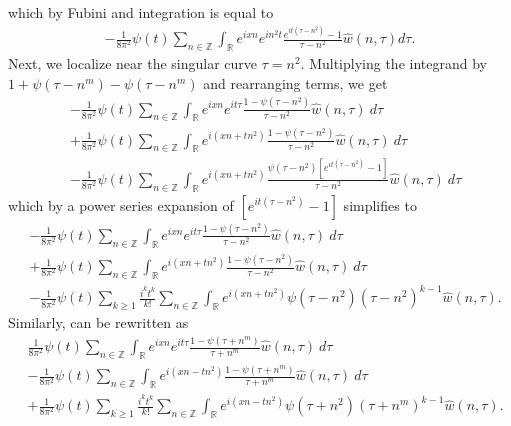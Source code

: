 \documentclass[12pt,reqno]{amsart}
\numberwithin{equation}{section}  %
\renewcommand{\cref}{\Cref}
\newcommand{\rr}{\mathbb{R}}
\newcommand{\zz}{\mathbb{Z}}
\newcommand{\wh}{\widehat}
\begin{document}
%
%
which by Fubini and integration is equal to
%
%
\begin{equation*}
\begin{split}
  -\frac{1}{8 \pi^{2}}  \psi(t) \sum_{n \in \zz} \int_{\rr} e^{ixn}
  e^{in^{2}t} \frac{e^{it(\tau - n^{2})} -1}{\tau - n^{2}}\wh{w}(n, \tau) d \tau.
\end{split}
\end{equation*}
%
Next, we localize near the singular curve $\tau =  n^2$.  Multiplying the
integrand by $1 + \psi(\tau -
n^m) - \psi(\tau -
n^m) $ and
rearranging terms, we get
%
%
\begin{equation*}
	\begin{split}
	& - \frac{1}{8 \pi^2}  \psi(t) \sum_{n \in \zz} \int_\rr e^{ixn}  
		e^{it \tau} \frac{1 - \psi(\tau - n^{2}) 
}{\tau - n^{2}} \wh{w}(n, \tau) \ d \tau
		\\
		& + \frac{1}{8 \pi^2}  \psi(t) \sum_{n \in \zz} \int _\rr e^{i(xn + 
		t n^{2})}
		 \frac{1- \psi(\tau - n^{2})}{\tau - n^{2}} \wh{w}(n, \tau) \ d \tau
		\\
		& - \frac{1}{8 \pi^2}  \psi(t) \sum_{n \in \zz} \int_\rr
		e^{i(xn + t n^{2})}
		\frac{\psi(\tau - n^{2})\left[ e^{it(\tau - n^{2})}-1 
		\right]}{\tau - n^{2}} \wh{w}(n, \tau) \ d \tau
	\end{split}
\end{equation*}
%
%
which by a power series expansion of $[e^{it(\tau - n^{2})}-1]$ simplifies  
to
%
%
\begin{align}
		\label{main-int-expression'-2}
		& -\frac{1}{8 \pi^2}  \psi(t) \sum_{n\in \zz} \int_\rr e^{ixn}  
		e^{it \tau} \frac{1 - \psi(\tau -  n^{2}) 
}{\tau -  n^{2}} \wh{w}(n, \tau) \ d \tau
		\\
		\label{main-int-expression'-3}
		& + \frac{1}{8 \pi^2}  \psi(t) \sum_{n\in \zz} \int_\rr e^{i(xn + 
		t n^{2})}
		 \frac{1- \psi(\tau -  n^{2})}{\tau -  n^{2}} \wh{w}(n, \tau) \ d \tau
		\\
		\label{main-int-expression'-4}
		& - \frac{1}{8 \pi^2}  \psi(t) \sum_{k \ge 1} \frac{i^k t^k}{k!}
		\sum_{n \in \zz} \int_\rr e^{i(xn + t n^{2} )}
		\psi(\tau -  n^{2}) (\tau -  n^{2})^{k-1} \wh{w}(n, \tau).
\end{align}
%
Similarly, \cref{term-4} can be rewritten as
%
\begin{align}
		\label{main-int-expression''-2}
		& \frac{1}{8 \pi^2}  \psi(t) \sum_{n\in \zz} \int_\rr e^{ixn}  
		e^{it \tau} \frac{1 - \psi(\tau +  n^m) 
}{\tau +  n^m} \wh{w}(n, \tau) \ d \tau
		\\
		\label{main-int-expression''-3}
		&  - \frac{1}{8 \pi^2}  \psi(t) \sum_{n\in \zz} \int_\rr e^{i(xn - 
		t n^2)}
		 \frac{1- \psi(\tau +  n^m)}{\tau +  n^m} \wh{w}(n, \tau) \ d \tau
		\\
		\label{main-int-expression''-4}
		& + \frac{1}{8 \pi^2}  \psi(t) \sum_{k \ge 1} \frac{i^k t^k}{k!}
		\sum_{n \in \zz} \int_\rr e^{i(xn - t n^2 )}
		\psi(\tau +  n^2) (\tau +  n^m)^{k-1} \wh{w}(n, \tau).
\end{align}
\end{document}
